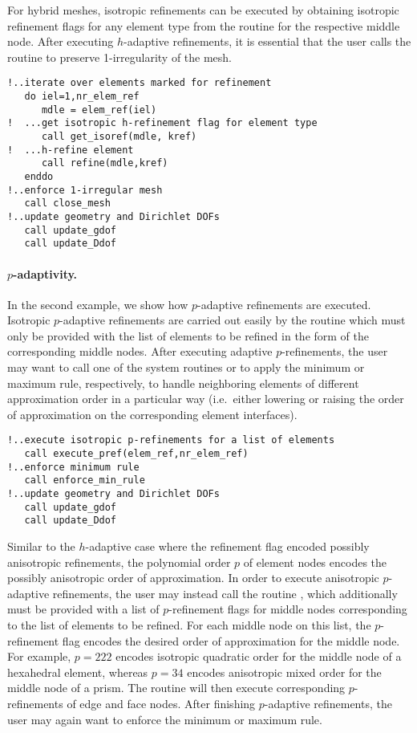 For hybrid meshes, isotropic refinements can be executed by obtaining isotropic refinement flags for any element type from the routine  for the respective middle node. After executing $h$-adaptive refinements, it is essential that the user calls the  routine to preserve 1-irregularity of the mesh.

\begin{lstlisting}[caption=Isotropic $h$-adaptive refinements., label={lst:adaptive_refinement_element_loop4}]
!..iterate over elements marked for refinement
   do iel=1,nr_elem_ref
      mdle = elem_ref(iel)
!  ...get isotropic h-refinement flag for element type
      call get_isoref(mdle, kref)
!  ...h-refine element
      call refine(mdle,kref)
   enddo
!..enforce 1-irregular mesh
   call close_mesh
!..update geometry and Dirichlet DOFs
   call update_gdof
   call update_Ddof
\end{lstlisting}

\paragraph{$p$-adaptivity.}
In the second example, we show how $p$-adaptive refinements are executed. Isotropic $p$-adaptive refinements are carried out easily by the routine  which must only be provided with the list of elements to be refined in the form of the corresponding middle nodes. After executing adaptive $p$-refinements, the user may want to call one of the system routines  or  to apply the minimum or maximum rule, respectively, to handle neighboring elements of different approximation order in a particular way (i.e.~either lowering or raising the order of approximation on the corresponding element interfaces).

\begin{lstlisting}[caption=Isotropic $p$-adaptive refinements., label={lst:adaptive_refinement_element_loop4}]
!..execute isotropic p-refinements for a list of elements
   call execute_pref(elem_ref,nr_elem_ref)
!..enforce minimum rule
   call enforce_min_rule
!..update geometry and Dirichlet DOFs
   call update_gdof
   call update_Ddof
\end{lstlisting}

Similar to the $h$-adaptive case where the refinement flag encoded possibly anisotropic refinements, the polynomial order $p$ of element nodes encodes the possibly anisotropic order of approximation. In order to execute anisotropic $p$-adaptive refinements, the user may instead call the routine , which additionally must be provided with a list of $p$-refinement flags for middle nodes corresponding to the list of elements to be refined. For each middle node on this list, the $p$-refinement flag encodes the desired order of approximation for the middle node. For example, $p=222$ encodes isotropic quadratic order for the middle node of a hexahedral element, whereas $p=34$ encodes anisotropic mixed order for the middle node of a prism. The routine will then execute corresponding $p$-refinements of edge and face nodes. After finishing $p$-adaptive refinements, the user may again want to enforce the minimum or maximum rule.

